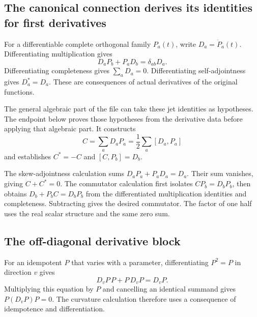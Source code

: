 \subsection{The canonical connection derives its identities for first derivatives}
For a differentiable complete orthogonal family $P_a(t)$, write $D_a=\dot P_a(t)$. Differentiating multiplication gives
\[
D_aP_b+P_aD_b=\delta_{ab}D_a.
\]
Differentiating completeness gives $\sum_aD_a=0$. Differentiating self-adjointness gives $D_a^*=D_a$. These are consequences of actual derivatives of the original functions.


The general algebraic part of the file can take these jet identities as hypotheses. The endpoint below proves those hypotheses from the derivative data before applying that algebraic part. It constructs
\[
C=\sum_aD_aP_a=\frac12\sum_a[D_a,P_a]
\]
and establishes $C^*=-C$ and $[C,P_b]=D_b$.



The skew-adjointness calculation sums $D_aP_a+P_aD_a=D_a$. Their sum vanishes, giving $C+C^*=0$. The commutator calculation first isolates $CP_b=D_bP_b$, then obtains $D_b+P_bC=D_bP_b$ from the differentiated multiplication identities and completeness. Subtracting gives the desired commutator. The factor of one half uses the real scalar structure and the same zero sum.

\subsection{The off-diagonal derivative block}
For an idempotent $P$ that varies with a parameter, differentiating $P^2=P$ in direction $v$ gives
\[
D_vP\,P+P\,D_vP=D_vP.
\]
Multiplying this equation by $P$ and cancelling an identical summand gives $P(D_vP)P=0$. The curvature calculation therefore uses a consequence of idempotence and differentiation.


